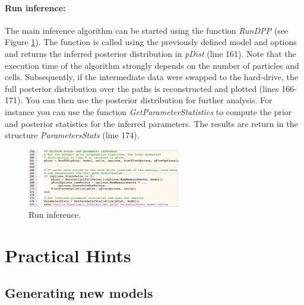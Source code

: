 \documentclass[a4paper, 9pt]{scrartcl}
\begin{document}
\paragraph{Run inference:}

The main inference algorithm can be started using the function \textit{RunDPP} (see Figure \ref{fig:Inference}). The function is called using the previously defined model and options and returns the inferred posterior distribution in \textit{pDist} (line 161). Note that the execution time of the algorithm strongly depends on the number of particles and cells. Subsequently, if the intermediate data were swapped to the hard-drive, the full posterior distribution over the paths is reconstructed and plotted (lines 166-171). You can then use the posterior distribution for further analysis. For instance you can use the function \textit{GetParameterStatistics} to compute the prior and posterior statistics for the inferred parameters. The results are return in the structure \textit{ParametersStats} (line 174). 

\begin{figure}[htbp]
\begin{center}
	\includegraphics[width=0.6\textwidth]{figures/Doc_Inference}
\caption{Run inference.}
\label{fig:Inference}
\end{center}
\end{figure}


\section{Practical Hints}

\subsection{Generating new models}
\label{sec:Models}
\end{document}

